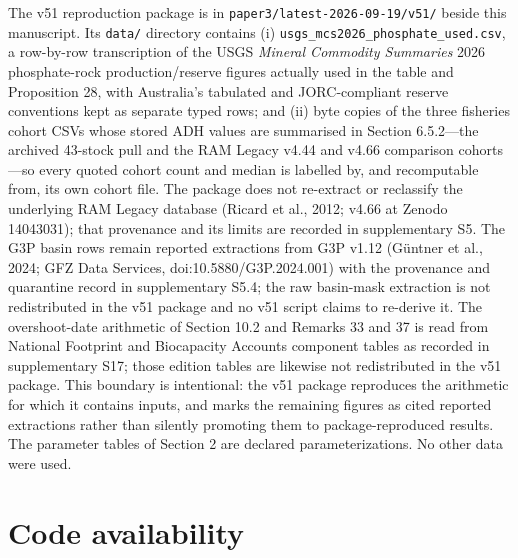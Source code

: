 \documentclass[11pt]{article}
\begin{document}
The v51 reproduction package is in \texttt{paper3/latest-2026-09-19/v51/} beside this manuscript. Its \texttt{data/} directory contains (i) \texttt{usgs\_mcs2026\_phosphate\_used.csv}, a row-by-row transcription of the USGS \emph{Mineral Commodity Summaries} 2026 phosphate-rock production/reserve figures actually used in the table and Proposition 28, with Australia's tabulated and JORC-compliant reserve conventions kept as separate typed rows; and (ii) byte copies of the three fisheries cohort CSVs whose stored ADH values are summarised in Section 6.5.2---the archived 43-stock pull and the RAM Legacy v4.44 and v4.66 comparison cohorts---so every quoted cohort count and median is labelled by, and recomputable from, its own cohort file. The package does not re-extract or reclassify the underlying RAM Legacy database (Ricard et al., 2012; v4.66 at Zenodo 14043031); that provenance and its limits are recorded in supplementary S5. The G3P basin rows remain reported extractions from G3P v1.12 (G\"{u}ntner et al., 2024; GFZ Data Services, doi:10.5880/G3P.2024.001) with the provenance and quarantine record in supplementary S5.4; the raw basin-mask extraction is not redistributed in the v51 package and no v51 script claims to re-derive it. The overshoot-date arithmetic of Section 10.2 and Remarks 33 and 37 is read from National Footprint and Biocapacity Accounts component tables as recorded in supplementary S17; those edition tables are likewise not redistributed in the v51 package. This boundary is intentional: the v51 package reproduces the arithmetic for which it contains inputs, and marks the remaining figures as cited reported extractions rather than silently promoting them to package-reproduced results. The parameter tables of Section 2 are declared parameterizations. No other data were used.

\section*{Code availability}\label{code-availability}
\end{document}
